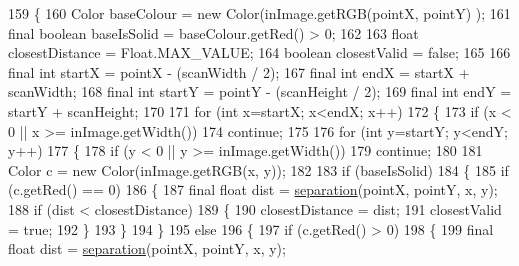 \begin{DoxyCode}
159     \{
160         Color baseColour = \textcolor{keyword}{new} Color(inImage.getRGB(pointX, pointY) );
161         \textcolor{keyword}{final} \textcolor{keywordtype}{boolean} baseIsSolid = baseColour.getRed() > 0;
162         
163         \textcolor{keywordtype}{float} closestDistance = Float.MAX\_VALUE;
164         \textcolor{keywordtype}{boolean} closestValid = \textcolor{keyword}{false};
165         
166         \textcolor{keyword}{final} \textcolor{keywordtype}{int} startX = pointX - (scanWidth / 2);
167         \textcolor{keyword}{final} \textcolor{keywordtype}{int} endX  = startX + scanWidth;
168         \textcolor{keyword}{final} \textcolor{keywordtype}{int} startY = pointY - (scanHeight / 2);
169         \textcolor{keyword}{final} \textcolor{keywordtype}{int} endY = startY + scanHeight;
170         
171         \textcolor{keywordflow}{for} (\textcolor{keywordtype}{int} x=startX; x<endX; x++)
172         \{
173             \textcolor{keywordflow}{if} (x < 0 || x >= inImage.getWidth())
174                 \textcolor{keywordflow}{continue};
175             
176             \textcolor{keywordflow}{for} (\textcolor{keywordtype}{int} y=startY; y<endY; y++)
177             \{           
178                 \textcolor{keywordflow}{if} (y < 0 || y >= inImage.getWidth())
179                     \textcolor{keywordflow}{continue};
180                 
181                 Color c = \textcolor{keyword}{new} Color(inImage.getRGB(x, y));
182                 
183                 \textcolor{keywordflow}{if} (baseIsSolid)
184                 \{
185                     \textcolor{keywordflow}{if} (c.getRed() == 0)
186                     \{
187                         \textcolor{keyword}{final} \textcolor{keywordtype}{float} dist = \mbox{\hyperlink{classorg_1_1newdawn_1_1slick_1_1tools_1_1hiero_1_1distancemap_1_1_distance_field_filter_a22ed8f3b6d1c38791056d8a063d85452}{separation}}(pointX, pointY, x, y);
188                         \textcolor{keywordflow}{if} (dist < closestDistance)
189                         \{
190                             closestDistance = dist;
191                             closestValid = \textcolor{keyword}{true};
192                         \}
193                     \}
194                 \}
195                 \textcolor{keywordflow}{else}
196                 \{
197                     \textcolor{keywordflow}{if} (c.getRed() > 0)
198                     \{
199                         \textcolor{keyword}{final} \textcolor{keywordtype}{float} dist = \mbox{\hyperlink{classorg_1_1newdawn_1_1slick_1_1tools_1_1hiero_1_1distancemap_1_1_distance_field_filter_a22ed8f3b6d1c38791056d8a063d85452}{separation}}(pointX, pointY, x, y);

\end{DoxyCode}
